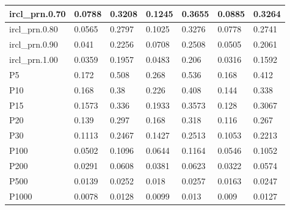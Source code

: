 \documentclass[jair, twoside,11pt,theapa]{article}
\begin{document}
\begin{table}[h!]
\begin{tabular}{|l|l|l|l|l|l|l|}
ircl\_prn.0.70 & 0.0788    & 0.3208   & 0.1245    & 0.3655    & 0.0885    & 0.3264   \\ \hline
ircl\_prn.0.80 & 0.0565    & 0.2797   & 0.1025    & 0.3276    & 0.0778    & 0.2741   \\ \hline
ircl\_prn.0.90 & 0.041     & 0.2256   & 0.0708    & 0.2508    & 0.0505    & 0.2061   \\ \hline
ircl\_prn.1.00 & 0.0359    & 0.1957   & 0.0483    & 0.206     & 0.0316    & 0.1592   \\ \hline
P5             & 0.172     & 0.508    & 0.268     & 0.536     & 0.168     & 0.412    \\ \hline
P10            & 0.168     & 0.38     & 0.226     & 0.408     & 0.144     & 0.338    \\ \hline
P15            & 0.1573    & 0.336    & 0.1933    & 0.3573    & 0.128     & 0.3067   \\ \hline
P20            & 0.139     & 0.297    & 0.168     & 0.318     & 0.116     & 0.267    \\ \hline
P30            & 0.1113    & 0.2467   & 0.1427    & 0.2513    & 0.1053    & 0.2213   \\ \hline
P100           & 0.0502    & 0.1096   & 0.0644    & 0.1164    & 0.0546    & 0.1052   \\ \hline
P200           & 0.0291    & 0.0608   & 0.0381    & 0.0623    & 0.0322    & 0.0574   \\ \hline
P500           & 0.0139    & 0.0252   & 0.018     & 0.0257    & 0.0163    & 0.0247   \\ \hline
P1000          & 0.0078    & 0.0128   & 0.0099    & 0.013     & 0.009     & 0.0127   \\ \hline
\end{tabular}
\end{table}
\end{document}

